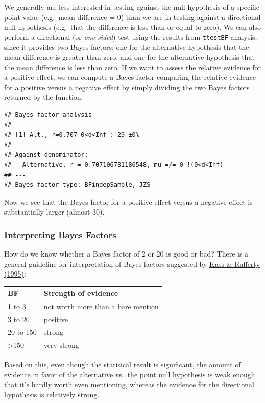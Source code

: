 \documentclass[12pt,]{book}
\theoremstyle{definition}
\theoremstyle{definition}
\theoremstyle{definition}
\theoremstyle{remark}
\begin{document}
We generally are less interested in testing against the null hypothesis of a specific point value (e.g.~mean difference = 0) than we are in testing against a directional null hypothesis (e.g.~that the difference is less than or equal to zero). We can also perform a directional (or \emph{one-sided}) test using the results from \texttt{ttestBF} analysis, since it provides two Bayes factors: one for the alternative hypothesis that the mean difference is greater than zero, and one for the alternative hypothesis that the mean difference is less than zero. If we want to assess the relative evidence for a positive effect, we can compute a Bayes factor comparing the relative evidence for a positive versus a negative effect by simply dividing the two Bayes factors returned by the function:

\begin{verbatim}
## Bayes factor analysis
## --------------
## [1] Alt., r=0.707 0<d<Inf : 29 ±0%
## 
## Against denominator:
##   Alternative, r = 0.707106781186548, mu =/= 0 !(0<d<Inf) 
## ---
## Bayes factor type: BFindepSample, JZS
\end{verbatim}

Now we see that the Bayes factor for a positive effect versus a negative effect is substantially larger (almost 30).

\hypertarget{interpreting-bayes-factors}{%
\subsubsection{Interpreting Bayes Factors}\label{interpreting-bayes-factors}}

How do we know whether a Bayes factor of 2 or 20 is good or bad? There is a general guideline for interpretation of Bayes factors suggested by \href{https://www.andrew.cmu.edu/user/kk3n/simplicity/KassRaftery1995.pdf}{Kass \& Rafferty (1995)}:

\begin{longtable}[]{@{}ll@{}}
\toprule
BF & Strength of evidence\tabularnewline
\midrule
\endhead
1 to 3 & not worth more than a bare mention\tabularnewline
3 to 20 & positive\tabularnewline
20 to 150 & strong\tabularnewline
\textgreater{}150 & very strong\tabularnewline
\bottomrule
\end{longtable}

Based on this, even though the statisical result is significant, the amount of evidence in favor of the alternative vs.~the point null hypothesis is weak enough that it's hardly worth even mentioning, whereas the evidence for the directional hypothesis is relatively strong.
\end{document}
